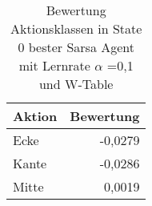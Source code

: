 \begin{table}
\centering
\caption{Bewertung Aktionsklassen in State 0 bester Sarsa Agent mit Lernrate $\alpha$ =0,1 und W-Table}

\begin{tabular}{lr}
\toprule
Aktion  & Bewertung \\ \midrule
Ecke	& -0,0279 \\
Kante	& -0,0286 \\
Mitte	&  0,0019 \\ \bottomrule

\end{tabular}
\end{table}